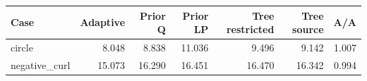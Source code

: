 \begin{tabular}{lrrrrrr}
\toprule
Case & Adaptive & Prior Q & Prior LP & Tree restricted & Tree source & A/A \\
\midrule
circle & 8.048 & 8.838 & 11.036 & 9.496 & 9.142 & 1.007 \\
negative\_curl & 15.073 & 16.290 & 16.451 & 16.470 & 16.342 & 0.994 \\
\bottomrule
\end{tabular}
